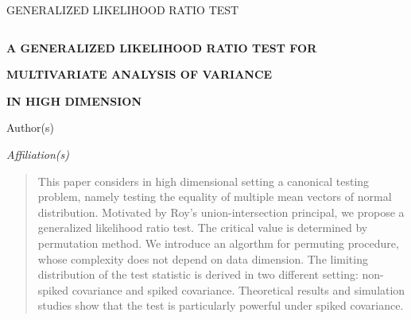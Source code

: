 \documentclass[12pt]{article} %
\theoremstyle{definition}
\begin{document}

\renewcommand{\baselinestretch}{2}


{\hfill {\footnotesize\rm GENERALIZED LIKELIHOOD RATIO TEST} \hfill}

\renewcommand{\thefootnote}{}
$\ $\par


\fontsize{12}{14pt plus.8pt minus .6pt}\selectfont \vspace{0.8pc}
\centerline{\large\bf A GENERALIZED LIKELIHOOD RATIO TEST FOR }
\vspace{2pt} \centerline{\large\bf MULTIVARIATE ANALYSIS OF VARIANCE}
\vspace{2pt} \centerline{\large\bf IN HIGH DIMENSION}
\vspace{.4cm} \centerline{Author(s)} \vspace{.4cm} \centerline{\it
Affiliation(s)} \vspace{.55cm} \fontsize{9}{11.5pt plus.8pt minus
.6pt}\selectfont


\begin{quotation}
This paper considers in high dimensional setting a canonical testing problem, namely testing the equality of multiple mean vectors of normal distribution.
    Motivated by Roy's union-intersection principal, we propose a generalized likelihood ratio test.
    The critical value is determined by permutation method.
    We introduce an algorthm for permuting procedure, whose complexity does not depend on data dimension.
    The limiting distribution of the test statistic is derived in two different setting: non-spiked covariance and spiked covariance.
    Theoretical results and simulation studies show that the test is particularly powerful under spiked covariance.

\vspace{9pt}
\par
\end{quotation}\par
\end{document}
